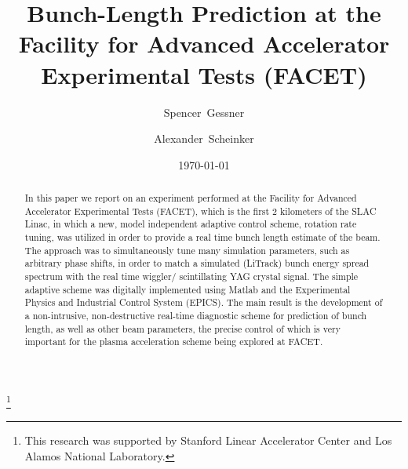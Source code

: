 \documentclass[%
twocolumn,
showpacs,preprintnumbers,
 aps,
prstab,
]{revtex4-1}
\begin{document}

\title{Bunch-Length Prediction at the Facility for Advanced Accelerator Experimental Tests (FACET)}


\author{Spencer~Gessner}
\author{Alexander~Scheinker}
\thanks{This research was supported by Stanford Linear Accelerator Center and Los Alamos National Laboratory.}


\date{\today}

\begin{abstract}
In this paper we report on an experiment performed at the Facility for Advanced Accelerator Experimental Tests (FACET), which is the first 2 kilometers of the SLAC Linac, in which a new, model independent adaptive control scheme, rotation rate tuning, was utilized in order to provide a real time bunch length estimate of the beam. The approach was to simultaneously tune many simulation parameters, such as arbitrary phase shifts, in order to match a simulated (LiTrack) bunch energy spread spectrum with the real time wiggler/ scintillating YAG crystal signal. The simple adaptive scheme was digitally implemented using Matlab and the Experimental Physics and Industrial Control System (EPICS). The main result is the development of a non-intrusive, non-destructive real-time diagnostic scheme for prediction of bunch length, as well as other beam parameters, the precise control of which is very important for the plasma acceleration scheme being explored at FACET.
\end{abstract}
\end{document}
